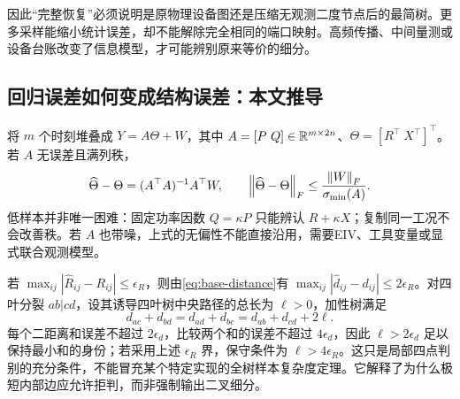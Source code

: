 \begin{center}
\end{center}

因此“完整恢复”必须说明是原物理设备图还是压缩无观测二度节点后的最简树。更多采样能缩小统计误差，却不能解除完全相同的端口映射。高频传播、中间量测或设备台账改变了信息模型，才可能辨别原来等价的细分。

\subsection{回归误差如何变成结构误差：本文推导}
将 $m$ 个时刻堆叠成 $Y=A\Theta+W$，其中 $A=[P\ Q]\in\R^{m\times2n}$、$\Theta=[R^\top\ X^\top]^\top$。若 $A$ 无误差且满列秩，
\begin{equation}
 \widehat\Theta-\Theta=(A^\top A)^{-1}A^\top W,
 \qquad \left\lVert\widehat\Theta-\Theta\right\rVert_F\leq\frac{\left\lVert W\right\rVert_F}{\sigma_{\min}(A)}.
\end{equation}
低样本并非唯一困难：固定功率因数 $Q=\kappa P$ 只能辨认 $R+\kappa X$；复制同一工况不会改善秩。若 $A$ 也带噪，上式的无偏性不能直接沿用，需要EIV、工具变量或显式联合观测模型。

若 $\max_{ij}|\widehat R_{ij}-R_{ij}|\leq\epsilon_R$，则由\eqref{eq:base-distance}有 $\max_{ij}|\widehat d_{ij}-d_{ij}|\leq2\epsilon_R$。对四叶分裂 $ab|cd$，设其诱导四叶树中央路径的总长为 $\ell>0$，加性树满足
\begin{equation}
 d_{ac}+d_{bd}=d_{ad}+d_{bc}=d_{ab}+d_{cd}+2\ell.
\end{equation}
每个二距离和误差不超过 $2\epsilon_d$，比较两个和的误差不超过 $4\epsilon_d$，因此 $\ell>2\epsilon_d$ 足以保持最小和的身份；若采用上述 $\epsilon_R$ 界，保守条件为 $\ell>4\epsilon_R$。这只是局部四点判别的充分条件，不能冒充某个特定实现的全树样本复杂度定理。它解释了为什么极短内部边应允许拒判，而非强制输出二叉细分。

